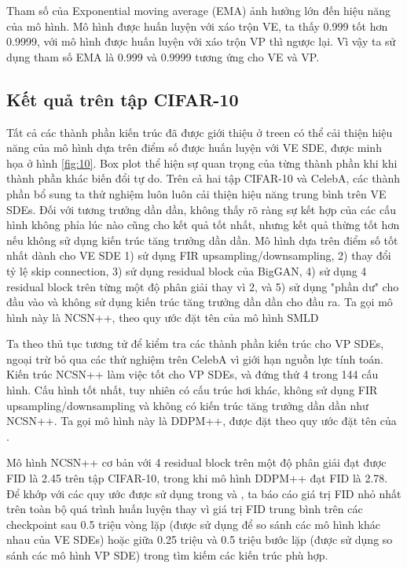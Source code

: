 \documentclass{article} %
\begin{document}
Tham số của Exponential moving average (EMA) ảnh hưởng lớn đến hiệu năng của mô hình.
Mô hình được huấn luyện với xáo trộn VE, ta thấy 0.999 tốt hơn 0.9999, với mô hình được huấn luyện với xáo trộn VP thì ngược lại.
Vì vậy ta sử dụng tham số EMA là 0.999 và 0.9999 tương ứng cho VE và VP.

\subsection{Kết quả trên tập CIFAR-10} \label{H.2}

Tất cả các thành phần kiến trúc đã được giới thiệu ở treen có thể cải thiện hiệu năng của mô hình dựa trên điểm số được huấn luyện với VE SDE, được minh họa ở hình \ref{fig:10}.
Box plot thể hiện sự quan trọng của từng thành phần khi khi thành phần khác biến đổi tự do.
Trên cả hai tập CIFAR-10 và CelebA, các thành phần bổ sung ta thử nghiệm luôn luôn cải thiện hiệu năng trung bình trên VE SDEs.
Đối với tương trưởng dần dần, không thấy rõ ràng sự kết hợp của các cấu hình không phỉa lúc nào cũng cho kết quả tốt nhất, nhưng kết quả thừng tốt hơn nếu không sử dụng kiến trúc tăng trưởng dần dần.
Mô hình dựa trên điểm số tốt nhất dành cho VE SDE 1) sử dụng FIR upsampling/downsampling, 2) thay đổi tỷ lệ skip connection, 3) sử dụng residual block của BigGAN, 4) sử dụng 4 residual block trên từng một độ phân giải thay vì 2, và 5) sử dụng "phần dư" cho đầu vào và không sử dụng kiến trúc tăng trưởng dần dần cho đầu ra.
Ta gọi mô hình này là NCSN++, theo quy ước đặt tên của mô hình SMLD \citep{song2019generative, song2020improved}

Ta theo thủ tục tương tử để kiểm tra các thành phần kiến trúc cho VP SDEs, ngoại trừ bỏ qua các thử nghiệm trên CelebA vì giới hạn nguồn lực tính toán.
Kiến trúc NCSN++ làm việc tốt cho VP SDEs, và đứng thứ 4 trong 144 cấu hình.
Cấu hình tốt nhất, tuy nhiên có cấu trúc hơi khác, không sử dụng FIR upsampling/downsampling và không có kiến trúc tăng trưởng dần dần như NCSN++.
Ta gọi mô hình này là DDPM++, được đặt theo quy ước đặt tên của \citep{ho2020denoising}.

Mô hình NCSN++ cơ bản với 4 residual block trên một độ phân giải đạt được FID là 2.45 trên tập CIFAR-10,
trong khi mô hình DDPM++ đạt FID là 2.78.
Để khớp với các quy ước được sử dụng trong \citep{karras2018progressive,song2019generative} và \citep{ho2020denoising}, ta báo cáo giá trị FID nhỏ nhất trên toàn bộ quá trình huấn luyện thay vì giá trị FID trung bình trên các checkpoint sau 0.5 triệu vòng lặp (được sử dụng để so sánh các mô hình khác nhau của VE SDEs) hoặc giữa 0.25 triệu và 0.5 triệu bước lặp (được sử dụng so sánh các mô hình VP SDE) trong tìm kiếm các kiến trúc phù hợp.
\end{document}
